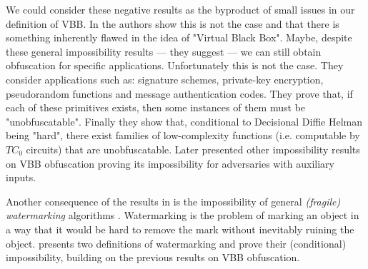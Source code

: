 We could consider these negative results as the byproduct of small issues in our definition of VBB. In \cite{VBB-imp} the authors show this is not the case and that there is something inherently flawed in the idea of "Virtual Black Box". Maybe, despite these general impossibility results --- they suggest --- we can still obtain obfuscation for specific applications. Unfortunately this is not the case. They consider applications such as: signature schemes, private-key encryption, pseudorandom functions and message authentication codes. They prove that, if each of these primitives exists, then some instances of them must be "unobfuscatable".
Finally they show that, conditional to Decisional Diffie Helman being "hard", there exist families of low-complexity functions (i.e. computable by $TC_0$ circuits) that are unobfuscatable.
Later \cite{VBB-imp-aux} presented other impossibility results on VBB obfuscation proving its impossibility for adversaries with auxiliary inputs.

Another consequence of the results in \cite{VBB-imp} is the impossibility of general \emph{(fragile) watermarking} algorithms \cite{collberg2002watermarking}. 
Watermarking is the problem of marking an object in a way that it would be hard to remove the mark without inevitably ruining the object. \cite{VBB-imp} presents two definitions of watermarking and prove their (conditional) impossibility, building on the previous results on VBB obfuscation.


